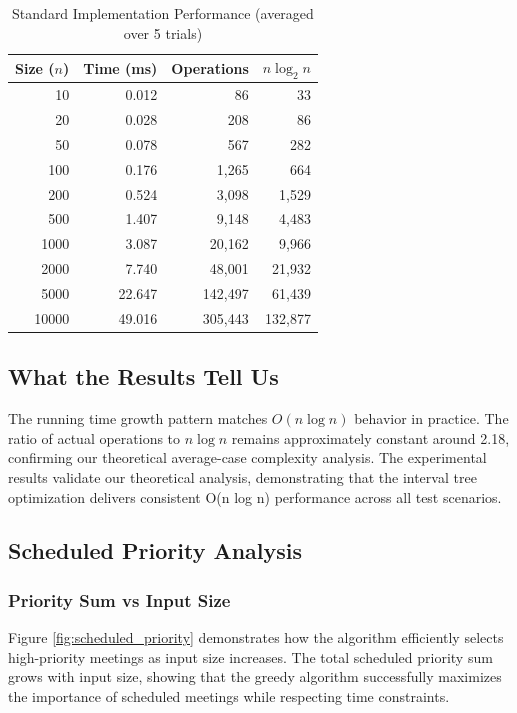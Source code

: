 \documentclass[conference]{IEEEtran}
\begin{document}
\begin{table}[htbp]
\caption{Standard Implementation Performance (averaged over 5 trials)}
\label{tab:experimental_results}
\centering
\begin{tabular}{@{}rrrr@{}}
\toprule
\textbf{Size ($n$)} & \textbf{Time (ms)} & \textbf{Operations} & \textbf{$n \log_2 n$} \\ \midrule
10 & 0.012 & 86 & 33 \\
20 & 0.028 & 208 & 86 \\
50 & 0.078 & 567 & 282 \\
100 & 0.176 & 1,265 & 664 \\
200 & 0.524 & 3,098 & 1,529 \\
500 & 1.407 & 9,148 & 4,483 \\
1000 & 3.087 & 20,162 & 9,966 \\
2000 & 7.740 & 48,001 & 21,932 \\
5000 & 22.647 & 142,497 & 61,439 \\
10000 & 49.016 & 305,443 & 132,877 \\ \bottomrule
\end{tabular}
\end{table}


\subsection{What the Results Tell Us}
\vspace{-1ex}

The running time growth pattern matches $O(n \log n)$ behavior in practice. The ratio of actual operations to $n \log n$ remains approximately constant around 2.18, confirming our theoretical average-case complexity analysis.
The experimental results validate our theoretical analysis, demonstrating that the interval tree optimization delivers consistent O(n log n) performance across all test scenarios.

\subsection{Scheduled Priority Analysis}
\vspace{-1ex}

\subsubsection{Priority Sum vs Input Size}
\vspace{-0.5ex}

Figure \ref{fig:scheduled_priority} demonstrates how the algorithm efficiently selects high-priority meetings as input size increases. The total scheduled priority sum grows with input size, showing that the greedy algorithm successfully maximizes the importance of scheduled meetings while respecting time constraints.
\end{document}
